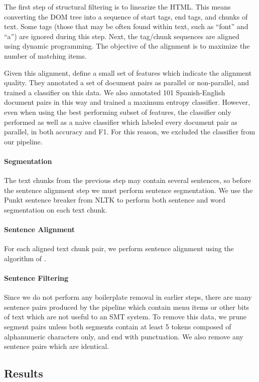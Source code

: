 The first step of structural filtering is to linearize the HTML. This means
converting the DOM tree into a sequence of start tags, end tags, and chunks of
text. Some tags (those that may be often found within text, such as ``font'' and
``a'') are ignored during this step. Next, the tag/chunk sequences are aligned
using dynamic programming. The objective of the alignment is to maximize the
number of matching items.

Given this alignment, \citet{Resnik03} define a small set of features which
indicate the alignment quality. They annotated a set of document pairs as
parallel or non-parallel, and trained a classifier on this data. We also
annotated 101 Spanish-English document pairs in this way and trained a
maximum entropy classifier. However, even when using the best performing subset
of features, the classifier only performed as well as a naive classifier which
labeled every document pair as parallel, in both accuracy and F1. For this reason,
we excluded the classifier from our pipeline.

\paragraph{Segmentation}
The text chunks from the previous step may contain several sentences, so before
the sentence alignment step we must perform sentence segmentation. We use the
Punkt sentence breaker from NLTK \citep{nltk} to perform both sentence and word
segmentation on each text chunk.

\paragraph{Sentence Alignment}
For each aligned text chunk pair, we perform sentence alignment using the
algorithm of \citet{Gale93}.

\paragraph{Sentence Filtering}
Since we do not perform any boilerplate removal in earlier steps, there are many
sentence pairs produced by the pipeline which contain menu items or other bits
of text which are not useful to an SMT system. To remove this data, we prune
segment pairs unless both segments contain at least 5 tokens composed of
alphanumeric characters only, and end with punctuation. We also remove any
sentence pairs which are identical.

\subsection{Results}

